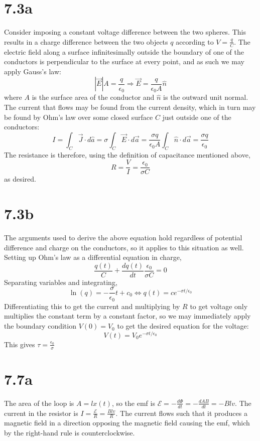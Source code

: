 \documentclass{article}
\begin{document}
\section*{7.3a}
Consider imposing a constant voltage difference between the two spheres. This results in a charge difference between the two objects $q$ according to $V=\frac{q}{C}$. The electric field along a surface infinitesimally outside the boundary of one of the conductors is perpendicular to the surface at every point, and as such we may apply Gauss's law:
\[|\vec{E}|A=\frac{q}{\epsilon_0}\Rightarrow \vec{E}=\frac{q}{\epsilon_0 A}\hat{n}\] where $A$ is the surface area of the conductor and $\hat{n}$ is the outward unit normal. The current that flows may be found from the current density, which in turn may be found by Ohm's law over some closed surface $C$ just outside one of the conductors:
\[I=\int_C\vec{J}\cdot d\hat{a}=\sigma\int_C\vec{E}\cdot d\vec{a}=\frac{\sigma q}{\epsilon_0A}\int_C\hat{n}\cdot d\vec{a}=\frac{\sigma q}{\epsilon_0}\]
The resistance is therefore, using the definition of capacitance mentioned above,
\[R=\frac{V}{I}=\frac{\epsilon_0}{\sigma C}\]
as desired.

\section*{7.3b}
The arguments used to derive the above equation hold regardless of potential difference and charge on the conductors, so it applies to this situation as well. Setting up Ohm's law as a differential equation in charge,
\[\frac{q(t)}{C}+\frac{dq(t)}{dt}\frac{\epsilon_0}{\sigma C}=0\]
Separating variables and integrating,
\[\ln(q)=-\frac{\sigma}{\epsilon_0}t+c_0\Leftrightarrow q(t)=ce^{-\sigma t/\epsilon_0}\]
Differentiating this to get the current and multiplying by $R$ to get voltage only multiplies the constant term by a constant factor, so we may immediately apply the boundary condition $V(0)=V_0$ to get the desired equation for the voltage:
\[V(t)=V_0e^{-\sigma t/\epsilon_0}\]
This gives $\tau=\frac{\epsilon_0}{\sigma}$

\section*{7.7a}
The area of the loop is $A=lx(t)$, so the emf is $\mathcal{E}=-\frac{d\Phi}{dt}=-\frac{dAB}{dt}=-Blv$. The current in the resistor is $I=\frac{\mathcal{E}}{R}=\frac{Blv}{R}$. The current flows such that it produces a magnetic field in a direction opposing the magnetic field causing the emf, which by the right-hand rule is counterclockwise.
\end{document}
